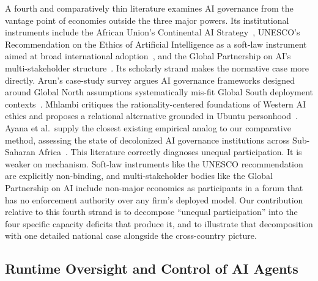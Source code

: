 \documentclass{ieeeaccess}
\begin{document}
A fourth and comparatively thin literature examines AI governance from the vantage point of economies outside the three major powers. Its institutional instruments include the African Union's Continental AI Strategy~\cite{au2024continentalai},
UNESCO's Recommendation on the Ethics of Artificial Intelligence as a soft-law instrument aimed at broad international adoption~\cite{unesco2021recommendation},
and the Global Partnership on AI's multi-stakeholder structure~\cite{gpai2024oecd}.
Its scholarly strand makes the normative case more directly. Arun's case-study survey argues AI governance frameworks designed around Global North assumptions systematically mis-fit Global South deployment contexts~\cite{arun2020ai}. Mhlambi critiques the rationality-centered foundations of Western AI ethics and proposes a relational alternative grounded in Ubuntu personhood~\cite{mhlambi2020rationality}. Ayana et al.\ supply the closest existing empirical analog to our comparative method, assessing the state of decolonized AI governance institutions across Sub-Saharan Africa~\cite{ayana2024decolonizing}.
This literature correctly diagnoses unequal participation. It is weaker on mechanism. Soft-law instruments like the UNESCO recommendation are explicitly non-binding, and multi-stakeholder bodies like the Global Partnership on AI include non-major economies as participants in a forum that has no enforcement authority over any firm's deployed model. Our contribution relative to this fourth strand is to decompose ``unequal participation'' into the four specific capacity deficits that produce it, and to illustrate that decomposition with one detailed national case alongside the cross-country picture.

\subsection{Runtime Oversight and Control of AI Agents}
\label{sec:related-runtime}
\end{document}
